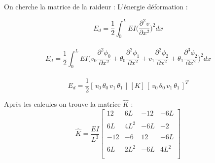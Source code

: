 On cherche la matrice de la raideur :
L'énergie déformation :
\begin{center}
$$E_d=\frac{1}{2}\int_0^LEI\Big(\frac{\partial^2v}{\partial x^2}\Big)^2dx$$\\
$$E_d=\frac{1}{2}\int_0^LEI\Big(v_0\frac{\partial^2\phi_0}{\partial x^2}+\theta_0\frac{\partial^2\phi_1}{\partial x^2}+v_1\frac{\partial^2\phi_2}{\partial x^2}+\theta_1\frac{\partial^3\phi_2}{\partial x^2}\Big)^2dx$$\\
$$E_d=\frac{1}{2}[\,v_0\,\theta_0\,v_1 \,\theta_1 \, ]\,[K]\,[\,v_0\,\theta_0\,v_1 \,\theta_1 \,  ]^T$$
\end{center}

Après les calcules on trouve la matrice $\widehat{K}$ :
\[ \widehat{K}=\frac{EI}{L^3}\left[ \begin{array}{cccc}
12 &6L& -12&-6L     \\\\
6L & 4L^2& -6L&-2 \\\\
-12 &-6& 12&-6L     \\\\
6L &2L^2& -6L&4L^2    \\\\
 \end{array} \right]\]